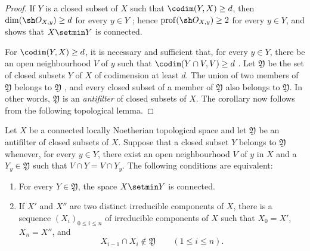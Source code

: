 \begin{proof}
If $Y$ is a closed subset of $X$ such that
$\codim(Y,X)\geq d$, then
$\dim(\sh O_{X,y})\geq d$ for every $y\in Y$
; hence
$\operatorname{prof}(\sh O_{X,y})\geq2$ for every $y\in Y$, and
 shows that $X\setmin Y$ is connected.

For $\codim(Y,X)\geq d$, it is necessary and sufficient that,
for every $y\in Y$, there be an open neighbourhood $V$ of $y$
such that $\codim(Y\cap V,V)\geq d$
.  Let $\mathfrak Y$ be the set of closed
subsets $Y$ of $X$ of codimension at least $d$.  The union of two
members of $\mathfrak Y$ belongs to $\mathfrak Y$
, and every closed subset of a member of
$\mathfrak Y$ also belongs to $\mathfrak Y$.  In other words,
$\mathfrak Y$ is an \emph{antifilter} of closed subsets of $X$.
The corollary now follows from the following topological lemma.
\end{proof}

\begin{lemma}[5.10.8.1]
\label{IV.5.10.8.1}
Let $X$ be a connected locally Noetherian topological space and
let $\mathfrak Y$ be an antifilter of closed subsets of $X$.
Suppose that a closed subset $Y$ belongs to $\mathfrak Y$ whenever,
for every $y\in Y$, there exist an open neighbourhood $V$ of $y$
in $X$ and a $Y_y\in\mathfrak Y$ such that
$V\cap Y=V\cap Y_y$.  The following conditions are equivalent:
\begin{enumerate}[{\rm a)}]
  \item For every $Y\in\mathfrak Y$, the space $X\setmin Y$ is connected.
  \item If $X'$ and $X''$ are two distinct irreducible components
  of $X$, there is a sequence $(X_i)_{0\leq i\leq n}$ of
  irreducible components of $X$ such that $X_0=X'$, $X_n=X''$,
  and
  \[
    X_{i-1}\cap X_i\notin\mathfrak Y
    \qquad(1\leq i\leq n).
  \]
\end{enumerate}
\end{lemma}

